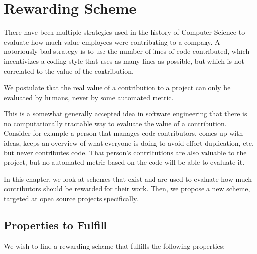 \chapter{Rewarding Scheme}
\label{sec:rewarding_scheme}

There have been multiple strategies used in the history of Computer Science to evaluate how much value employees were contributing to a company.
A notoriously bad strategy is to use the number of lines of code contributed, which incentivizes a coding style that uses as many lines as possible, but which is not correlated to the value of the contribution.

\begin{proposition}
  We postulate that the real value of a contribution to a project can only be evaluated by humans, never by some automated metric.
\end{proposition}

This is a somewhat generally accepted idea in software engineering that there is no computationally tractable way to evaluate the value of a contribution.
Consider for example a person that manages code contributors, comes up with ideas, keeps an overview of what everyone is doing to avoid effort duplication, etc. but never contributes code.
That person's contributions are also valuable to the project, but no automated metric based on the code will be able to evaluate it.

In this chapter, we look at schemes that exist and are used to evaluate how much contributors should be rewarded for their work.
Then, we propose a new scheme, targeted at open source projects specifically.

\section{Properties to Fulfill}

We wish to find a rewarding scheme that fulfills the following properties:

